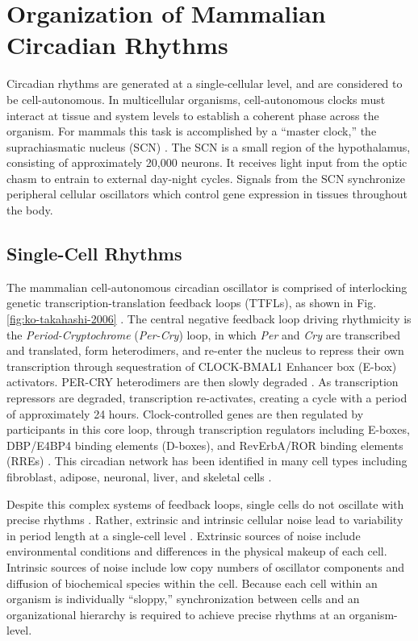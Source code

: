 \section{Organization of Mammalian Circadian Rhythms}
Circadian rhythms are generated at a single-cellular level, and are considered to be cell-autonomous.
In multicellular organisms, cell-autonomous clocks must interact at tissue and system levels to establish a coherent phase across the organism.
For mammals this task is accomplished by a ``master clock,'' the suprachiasmatic nucleus (SCN) \cite{Welsh2010}.
The SCN is a small region of the hypothalamus, consisting of approximately 20,000 neurons.
It receives light input from the optic chasm to entrain to external day-night cycles.
Signals from the SCN synchronize peripheral cellular oscillators which control gene expression in tissues throughout the body.

\subsection*{Single-Cell Rhythms}
The mammalian cell-autonomous circadian oscillator is comprised of interlocking genetic transcription-translation feedback loops (TTFLs), as shown in Fig. \ref{fig:ko-takahashi-2006} \cite{Ko2006}.
The central negative feedback loop driving rhythmicity is the \textit{Period-Cryptochrome} (\textit{Per-Cry}) loop, in which \textit{Per} and \textit{Cry} are transcribed and translated, form heterodimers, and re-enter the nucleus to repress their own transcription through sequestration of CLOCK-BMAL1 Enhancer box (E-box) activators. 
PER-CRY heterodimers are then slowly degraded \cite{Hirota2012a}.
As transcription repressors are degraded, transcription re-activates, creating a cycle with a period of approximately 24 hours.
Clock-controlled genes are then regulated by participants in this core loop, through transcription regulators including E-boxes, DBP/E4BP4 binding elements (D-boxes), and RevErbA/ROR binding elements (RREs) \cite{Ueda2005}.
This circadian network has been identified in many cell types including fibroblast, adipose, neuronal, liver, and skeletal cells \cite{Ando2005,Liu2007,Lamia2009,Zambon2003}.

Despite this complex systems of feedback loops, single cells do not oscillate with precise rhythms \cite{Barkai2000, Herzog2004}.
Rather, extrinsic and intrinsic cellular noise lead to variability in period length at a single-cell level \cite{Scott2006}.
Extrinsic sources of noise include environmental conditions and differences in the physical makeup of each cell. 
Intrinsic sources of noise include low copy numbers of oscillator components and diffusion of biochemical species within the cell.
Because each cell within an organism is individually ``sloppy,'' synchronization between cells and an organizational hierarchy is required to achieve precise rhythms at an organism-level.


